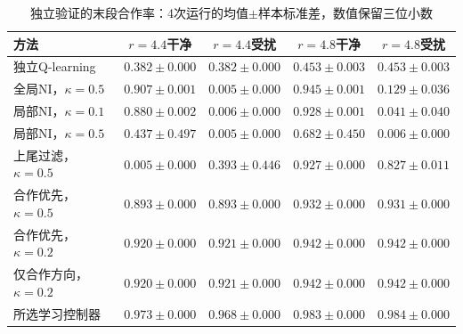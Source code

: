 \begin{table}[!htbp]
\centering\small
\caption{独立验证的末段合作率：4次运行的均值$\pm$样本标准差，数值保留三位小数}
\label{tab:w2-validation-semantic}
\begin{tabular}{lcccc}
\toprule
方法 & $r=4.4$干净 & $r=4.4$受扰 & $r=4.8$干净 & $r=4.8$受扰 \\
\midrule
独立Q-learning & $0.382\pm0.000$ & $0.382\pm0.000$ & $0.453\pm0.003$ & $0.453\pm0.003$ \\
全局NI，$\kappa=0.5$ & $0.907\pm0.001$ & $0.005\pm0.000$ & $0.945\pm0.001$ & $0.129\pm0.036$ \\
局部NI，$\kappa=0.1$ & $0.880\pm0.002$ & $0.006\pm0.000$ & $0.928\pm0.001$ & $0.041\pm0.040$ \\
局部NI，$\kappa=0.5$ & $0.437\pm0.497$ & $0.005\pm0.000$ & $0.682\pm0.450$ & $0.006\pm0.000$ \\
上尾过滤，$\kappa=0.5$ & $0.005\pm0.000$ & $0.393\pm0.446$ & $0.927\pm0.000$ & $0.827\pm0.011$ \\
合作优先，$\kappa=0.5$ & $0.893\pm0.000$ & $0.893\pm0.000$ & $0.932\pm0.000$ & $0.931\pm0.000$ \\
合作优先，$\kappa=0.2$ & $0.920\pm0.000$ & $0.921\pm0.000$ & $0.942\pm0.000$ & $0.942\pm0.000$ \\
仅合作方向，$\kappa=0.2$ & $0.920\pm0.000$ & $0.921\pm0.000$ & $0.942\pm0.000$ & $0.942\pm0.000$ \\
所选学习控制器 & $0.973\pm0.000$ & $0.968\pm0.000$ & $0.983\pm0.000$ & $0.984\pm0.000$ \\
\bottomrule
\end{tabular}
\par{}
\end{table}
